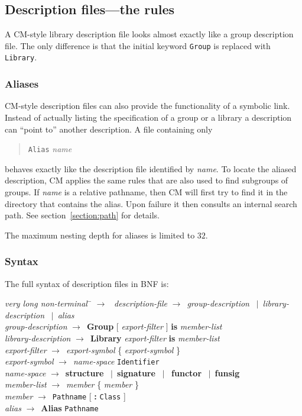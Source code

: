 \documentclass{article}
\newcommand{\nt}[1]{{\it #1}}
\newcommand{\tl}[1]{{\bf #1}}
\newcommand{\ar}{$\rightarrow$\ }
\newcommand{\vb}{~$|$~}
\begin{document}
\subsection{Description files---the rules}

A CM-style library description file looks almost exactly like a
group description file.  The only difference is that the initial
keyword {\tt Group} is replaced with {\tt Library}.

\subsubsection{Aliases}

CM-style description files can also provide the functionality of a
symbolic link.  Instead of actually listing the specification of a
group or a library a description can ``point to'' another description.
A file containing only
\begin{quote}
{\tt Alias} {\em name}
\end{quote}
\noindent behaves exactly like the description file identified by {\em
name}.  To locate the aliased description, CM applies the same rules
that are also used to find subgroups of groups.  If {\em name} is a
relative pathname, then CM will first try to find it in the directory
that contains the alias.  Upon failure it then consults an internal
search path. See section~\ref{section:path} for details.

The maximum nesting depth for aliases is limited to $32$.

\subsubsection{Syntax}

The full syntax of description files in BNF is:

\begin{tabbing}
\nt{very long non-terminal}~\= \ar \kill
\nt{description-file} \> \ar \nt{group-description} \vb \nt{library-description} \vb \nt{alias} \\
\nt{group-description} \> \ar \tl{Group} [ \nt{export-filter} ]
  \tl{is} \nt{member-list} \\
\nt{library-description} \> \ar \tl{Library} \nt{export-filter}
\tl{is} \nt{member-list} \\
\nt{export-filter} \> \ar \nt{export-symbol} \{ \nt{export-symbol} \} \\
\nt{export-symbol} \> \ar \nt{name-space} {\tt Identifier} \\
\nt{name-space} \> \ar \tl{structure} \vb \tl{signature} \vb
  \tl{functor} \vb \tl{funsig} \\
\nt{member-list} \> \ar \nt{member} \{ \nt{member} \} \\
\nt{member} \> \ar {\tt Pathname} [ \tl{:} {\tt Class} ] \\
\nt{alias} \> \ar \tl{Alias} {\tt Pathname}
\end{tabbing}
\end{document}
